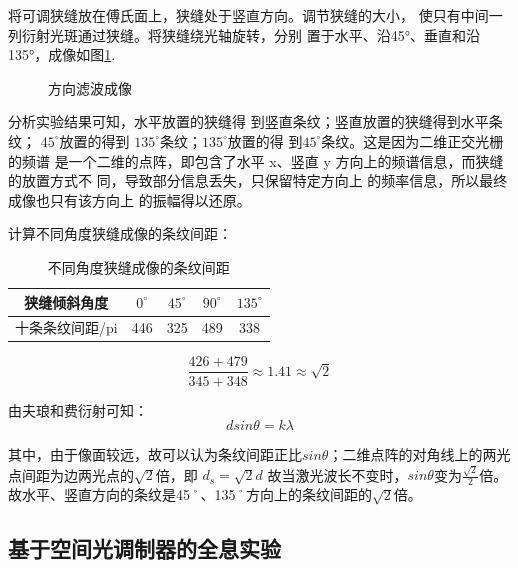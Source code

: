 \documentclass[10pt,a4paper,twoside,UTF8]{ctexart}
\begin{document}
将可调狭缝放在傅氏面上，狭缝处于竖直方向。调节狭缝的大小，
使只有中间一列衍射光斑通过狭缝。将狭缝绕光轴旋转，分别
置于水平、沿45°、垂直和沿135°，成像如图\ref{fig:dir}.
\begin{figure}[H]
	\centering

	\caption{方向滤波成像}
	\label{fig:dir}
\end{figure}

分析实验结果可知，水平放置的狭缝得
到竖直条纹；竖直放置的狭缝得到水平条纹；
$45^{\circ}$放置的得到 $135^{\circ}$条纹；$135^{\circ}$放置的得
到$45^{\circ}$条纹。这是因为二维正交光栅的频谱
是一个二维的点阵，即包含了水平 x、竖直
y 方向上的频谱信息，而狭缝的放置方式不
同，导致部分信息丢失，只保留特定方向上
的频率信息，所以最终成像也只有该方向上
的振幅得以还原。

计算不同角度狭缝成像的条纹间距：
\begin{table}[H]
	\centering
	  \begin{tabular}{ccccc}
	  \toprule
	  狭缝倾斜角度&$0^{\circ}$ & $45^{\circ}$ &$90^{\circ}$ & $135^{\circ}$   \\
	  \midrule
	  十条条纹间距/pi & 446  & 325 &489& 338 \\
	  \bottomrule
	  \end{tabular}
	\caption{不同角度狭缝成像的条纹间距}
	\label{tab:distance}
\end{table}

\begin{equation*}
	\frac{426+479}{345+348}\approx 1.41\approx \sqrt{2}
\end{equation*}

由夫琅和费衍射可知：
\begin{equation*}
	dsin\theta=k\lambda
\end{equation*}

其中，由于像面较远，故可以认为条纹间距正比$sin\theta$；二维点阵的对角线上的两光点间距为边两光点的$\sqrt{2}$倍，即
$d_s=\sqrt{2} d$
故当激光波长不变时，$sin\theta$变为$\frac{\sqrt{2}}{2}$倍。故水平、竖直方向的条纹是45˚、135˚方向上的条纹间距的$\sqrt{2}$倍。
  
\subsection{基于空间光调制器的全息实验}
\end{document}

